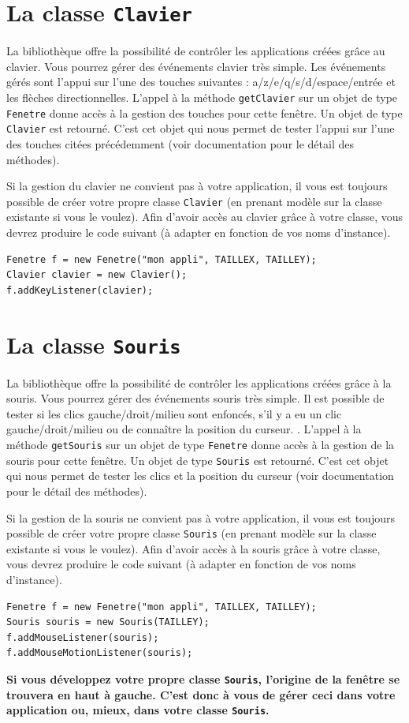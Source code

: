 \documentclass[12pt]{exam}
\begin{document}
\section{La classe \texttt{Clavier}}
La bibliothèque offre la possibilité de contrôler les applications créées grâce au clavier. Vous pourrez gérer des événements clavier très simple. Les événements gérés sont l'appui sur l'une des touches suivantes : a/z/e/q/s/d/espace/entrée et les flèches directionnelles.
L'appel à la méthode \texttt{getClavier} sur un objet de type \texttt{Fenetre} donne accès à la gestion des touches pour cette fenêtre. Un objet de type \texttt{Clavier} est retourné. C'est cet objet qui nous permet de tester l'appui sur l'une des touches citées précédemment (voir documentation pour le détail des méthodes).

Si la gestion du clavier ne convient pas à votre application, il vous est toujours possible de créer votre propre classe \texttt{Clavier} (en prenant modèle sur la classe existante si vous le voulez). Afin d'avoir accès au clavier grâce à votre classe, vous devrez produire le code suivant (à adapter en fonction de vos noms d'instance).
\begin{lstlisting}
Fenetre f = new Fenetre("mon appli", TAILLEX, TAILLEY);
Clavier clavier = new Clavier();
f.addKeyListener(clavier);
\end{lstlisting}

\section{La classe \texttt{Souris}}
La bibliothèque offre la possibilité de contrôler les applications créées grâce à la souris. Vous pourrez gérer des événements souris très simple. Il est possible de tester si les clics gauche/droit/milieu sont enfoncés, s'il y a eu un clic gauche/droit/milieu ou de connaître la position du curseur.
.
L'appel à la méthode \texttt{getSouris} sur un objet de type \texttt{Fenetre} donne accès à la gestion de la souris pour cette fenêtre. Un objet de type \texttt{Souris} est retourné. C'est cet objet qui nous permet de tester les clics et la position du curseur (voir documentation pour le détail des méthodes).

Si la gestion de la souris ne convient pas à votre application, il vous est toujours possible de créer votre propre classe \texttt{Souris} (en prenant modèle sur la classe existante si vous le voulez). Afin d'avoir accès à la souris grâce à votre classe, vous devrez produire le code suivant (à adapter en fonction de vos noms d'instance).
\begin{lstlisting}
Fenetre f = new Fenetre("mon appli", TAILLEX, TAILLEY);
Souris souris = new Souris(TAILLEY);
f.addMouseListener(souris);
f.addMouseMotionListener(souris);
\end{lstlisting}
\danger \textbf{Si vous développez votre propre classe \texttt{Souris}, l'origine de la fenêtre se trouvera en haut à gauche. C'est donc à vous de gérer ceci dans votre application ou, mieux, dans votre classe \texttt{Souris}.}
\end{document}

